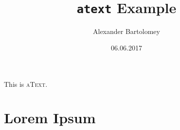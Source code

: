 \documentclass{atext}
\title{\texttt{atext} Example}
\author{Alexander Bartolomey}
\date{06.06.2017}
\begin{document}
\maketitle
This is \textsc{aText}.
\section{Lorem Ipsum}
\lipsum[1-14]
\end{document}
